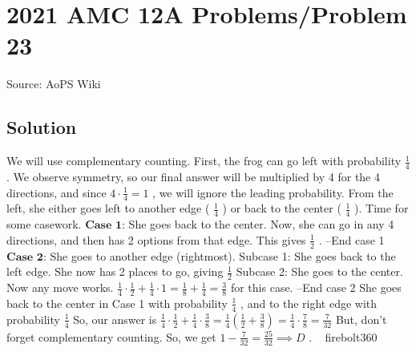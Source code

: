 \documentclass[12pt]{article}
\begin{document}
\section*{{2021 AMC 12A Problems/Problem 23}}
Source: AoPS Wiki

\subsection*{Solution}
We will use complementary counting.
First, the frog can go left with probability $\frac14$ . We observe symmetry, so our final answer will be multiplied by 4 for the 4 directions, and since $4\cdot \frac14=1$ , we will ignore the leading probability. From the left, she either goes left to another edge ( $\frac14$ ) or back to the center ( $\frac14$ ). Time for some casework. $\textbf{Case 1:}$ She goes back to the center. Now, she can go in any 4 directions, and then has 2 options from that edge. This gives $\frac12$ . --End case 1 $\textbf{Case 2:}$ She goes to another edge (rightmost). Subcase 1: She goes back to the left edge. She now has 2 places to go, giving $\frac12$ Subcase 2: She goes to the center. Now any move works. $\frac14 \cdot \frac12 + \frac14 \cdot 1=\frac18 + \frac 14=\frac38$ for this case. --End case 2 She goes back to the center in Case 1 with probability $\frac14$ , and to the right edge with probability $\frac14$ So, our answer is $\frac14 \cdot \frac12 + \frac14 \cdot \frac38=\frac14 (\frac12+\frac38)=\frac14 \cdot \frac78 = \frac7{32}$ But, don't forget complementary counting. So, we get $1-\frac7{32}=\frac{25}{32} \implies \boxed{D}$ . ~ firebolt360
\end{document}
